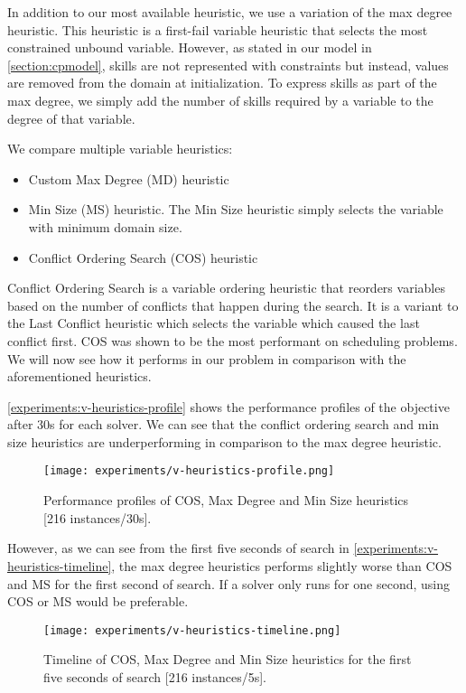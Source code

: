 \documentclass[../../thesis.tex]{subfiles}
\begin{document}
In addition to our most available heuristic, we use a variation of the max degree heuristic. 
This heuristic is a first-fail variable heuristic that selects the most constrained unbound variable. However,
as stated in our model in \autoref{section:cpmodel}, skills are not represented with constraints but instead, values 
are removed from the domain at initialization. To express skills as part of the max degree, we simply add the number of 
skills required by a variable to the degree of that variable.


We compare multiple variable heuristics:

\begin{itemize}
  \item Custom Max Degree (MD) heuristic
  \item Min Size (MS) heuristic. The Min Size heuristic simply selects the variable with minimum domain size.
  \item Conflict Ordering Search (COS) heuristic \cite{Gay:COS}
\end{itemize}


Conflict Ordering Search is a variable ordering heuristic that 
reorders variables based on the number of conflicts that happen during the search.
It is a variant to the Last Conflict heuristic which selects the variable which caused the last conflict first.
COS was shown to be the most performant on scheduling problems. 
We will now see how it performs in our problem in comparison with the aforementioned heuristics.

\autoref{experiments:v-heuristics-profile} shows the performance profiles of the objective after 30s for each solver.
We can see that the conflict ordering search and min size heuristics are underperforming in comparison to the max degree heuristic.


\begin{figure}
  \centering
  \texttt{[image: experiments/v-heuristics-profile.png]}
  \caption{Performance profiles of COS, Max Degree and Min Size heuristics [216 instances/30s].}
  \label{experiments:v-heuristics-profile}
\end{figure}

However, as we can see from the first five seconds of search in \autoref{experiments:v-heuristics-timeline}, the 
max degree heuristics performs slightly worse than COS and MS for the first second of search. If a solver only runs for 
one second, using COS or MS would be preferable.

\begin{figure}
  \centering
  \texttt{[image: experiments/v-heuristics-timeline.png]}
  \caption{Timeline of COS, Max Degree and Min Size heuristics for the first five seconds of search [216 instances/5s].}
  \label{experiments:v-heuristics-timeline}
\end{figure}
\end{document}
